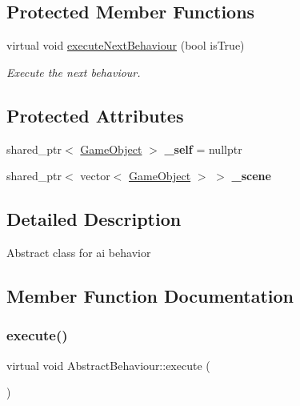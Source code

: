 \subsection*{Protected Member Functions}
\begin{DoxyCompactItemize}
\item 
virtual void \mbox{\hyperlink{class_abstract_behaviour_a931021cf02c0a2dd40fac4a86d1d5d25}{execute\+Next\+Behaviour}} (bool is\+True)
\begin{DoxyCompactList}\small\item\em Execute the next behaviour. \end{DoxyCompactList}\end{DoxyCompactItemize}
\subsection*{Protected Attributes}
\begin{DoxyCompactItemize}
\item 
\mbox{\label{class_abstract_behaviour_a4e825e734fdfe11ee2d030f909765845}} 
shared\+\_\+ptr$<$ \mbox{\hyperlink{class_game_object}{Game\+Object}} $>$ {\bfseries \+\_\+self} = nullptr
\item 
\mbox{\label{class_abstract_behaviour_a4c97685f487ce0f429276df8d003b70e}} 
shared\+\_\+ptr$<$ vector$<$ \mbox{\hyperlink{class_game_object}{Game\+Object}} $>$ $>$ {\bfseries \+\_\+scene}
\end{DoxyCompactItemize}


\subsection{Detailed Description}
Abstract class for ai behavior 



\subsection{Member Function Documentation}
\mbox{\label{class_abstract_behaviour_ab99fb55a3b001e759e24d5b9721a742f}} 
\subsubsection{\texorpdfstring{execute()}{execute()}}
{\footnotesize\ttfamily virtual void Abstract\+Behaviour\+::execute (\begin{DoxyParamCaption}{ }\end{DoxyParamCaption})\hspace{0.3cm}{\ttfamily [pure virtual]}}



